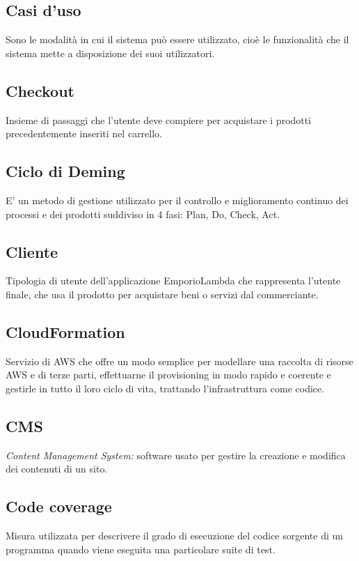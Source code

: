 \subsection*{Casi d'uso}
Sono le modalità in cui il sistema può essere utilizzato, cioè le funzionalità che il sistema mette a disposizione dei suoi utilizzatori.

\subsection*{Checkout}
Insieme di passaggi che l'utente deve compiere per acquistare i prodotti precedentemente inseriti nel carrello.

\subsection*{Ciclo di Deming}
E’ un metodo di gestione utilizzato per il controllo e miglioramento continuo dei processi e dei prodotti
suddiviso in 4 fasi: Plan, Do, Check, Act.

\subsection*{Cliente}
Tipologia di utente dell'applicazione EmporioLambda che rappresenta l'utente finale, che usa il prodotto per acquistare beni o servizi dal commerciante.

\subsection*{CloudFormation}
Servizio di AWS che offre un modo semplice per modellare una raccolta di risorse AWS e di terze parti, effettuarne il provisioning in modo rapido e coerente e gestirle in tutto il loro ciclo di vita, trattando l'infrastruttura come codice.

\subsection*{CMS}
\textit{Content Management System:} software usato per gestire la creazione e modifica dei contenuti di un sito.

\subsection*{Code coverage}
Misura utilizzata per descrivere il grado di esecuzione del codice sorgente di un programma quando viene eseguita una particolare suite di test.

